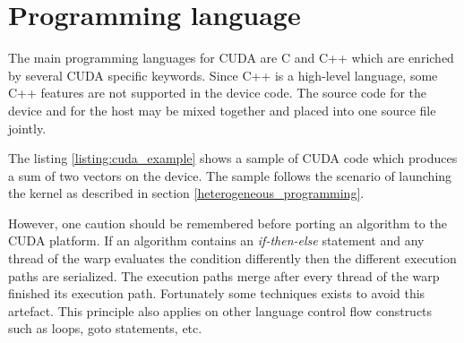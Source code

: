 \documentclass[12pt,twoside]{fithesis2}
\begin{document}
\section{Programming language}
\label{cuda_lang}

The main programming languages for CUDA are C and C++ which are enriched by several CUDA specific keywords. Since C++ is a high-level language, some C++ features are not supported in the device code. The source code for the device and for the host may be mixed together and placed into one source file jointly.~\cite{cuda_guide}

The listing \ref{listing:cuda_example} shows a sample of CUDA code which produces a sum of two vectors on the device. The sample follows the scenario of launching the kernel as described in section \ref{heterogeneous_programming}.

However, one caution should be remembered before porting an algorithm to the CUDA platform. If an algorithm contains an \emph{if-then-else} statement and any thread of the warp evaluates the condition differently then the different execution paths are serialized. The execution paths merge after every thread of the warp finished its execution path. Fortunately some techniques exists to avoid this artefact. This principle also applies on other language control flow constructs such as loops, goto statements, etc.~\cite{cuda_guide}
\end{document}
